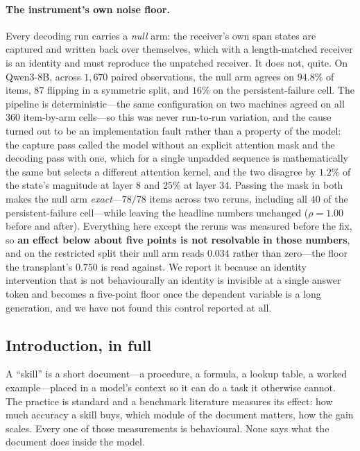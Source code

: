 \documentclass{article}
\begin{document}
\paragraph{The instrument's own noise floor.} Every decoding run carries a
\emph{null} arm: the receiver's own span states are captured and written back
over themselves, which with a length-matched receiver is an identity and must
reproduce the unpatched receiver. It does not, quite. On Qwen3-8B, across
$1{,}670$ paired observations, the null arm agrees on $94.8\%$ of items, $87$
flipping in a symmetric split, and $16\%$ on the persistent-failure cell. The
pipeline is deterministic---the same configuration on two machines agreed on all
$360$ item-by-arm cells---so this was never run-to-run variation, and the cause
turned out to be an implementation fault rather than a property of the model:
the capture pass called the model without an explicit attention mask and the
decoding pass with one, which for a single unpadded sequence is mathematically
the same but selects a different attention kernel, and the two disagree by
$1.2\%$ of the state's magnitude at layer 8 and $25\%$ at layer 34. Passing the
mask in both makes the null arm \emph{exact}---$78/78$ items across two reruns,
including all $40$ of the persistent-failure cell---while leaving the headline
numbers unchanged ($\rho = 1.00$ before and after). Everything here except the
reruns was measured before the fix, so \textbf{an effect below about five points
is not resolvable in those numbers}, and on the restricted split their null arm
reads $0.034$ rather than zero---the floor the transplant's $0.750$ is read
against. We report it because an identity intervention that is not
behaviourally an identity is invisible at a single answer token and becomes a
five-point floor once the dependent variable is a long generation, and we have
not found this control reported at all.




\subsection{Introduction, in full}
\label{app:intro}

A ``skill'' is a short document---a procedure, a formula, a lookup table, a
worked example---placed in a model's context so it can do a task it otherwise
cannot. The practice is standard and a benchmark literature measures its effect:
how much accuracy a skill buys, which module of the document matters, how the
gain scales. Every one of those measurements is behavioural. None says what the
document does inside the model.
\end{document}
